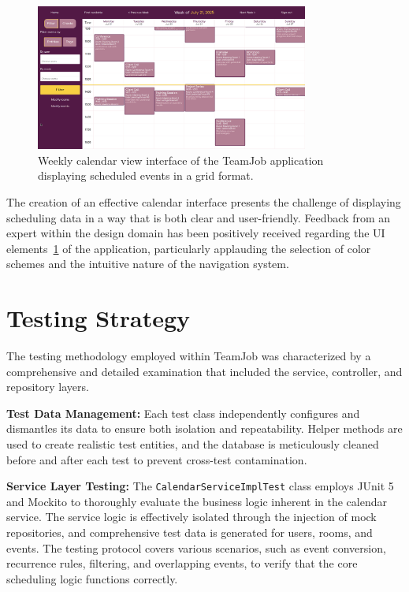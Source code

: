 \begin{figure}[htbp]
    \centering
    \includegraphics[width=0.8\textwidth]{Week_view}
    \caption{Weekly calendar view interface of the TeamJob application displaying scheduled events in a grid format.}
    \label{fig:week-view}
\end{figure}

The creation of an effective calendar interface presents the challenge of displaying scheduling data in a way that is both clear and user-friendly.
Feedback from an expert within the design domain has been positively received regarding the UI elements~\ref{fig:week-view} of the application, particularly applauding the selection of color schemes and the intuitive nature of the navigation system.


\section{Testing Strategy}\label{sec:testing-strategy}
The testing methodology employed within TeamJob was characterized by a comprehensive and detailed examination that included the service, controller, and repository layers.

\textbf{Test Data Management:} Each test class independently configures and dismantles its data to ensure both isolation and repeatability.
Helper methods are used to create realistic test entities, and the database is meticulously cleaned before and after each test to prevent cross-test contamination.

\textbf{Service Layer Testing:} The \texttt{CalendarServiceImplTest} class employs JUnit 5 and Mockito to thoroughly evaluate the business logic inherent in the calendar service.
The service logic is effectively isolated through the injection of mock repositories, and comprehensive test data is generated for users, rooms, and events.
The testing protocol covers various scenarios, such as event conversion, recurrence rules, filtering, and overlapping events, to verify that the core scheduling logic functions correctly.

